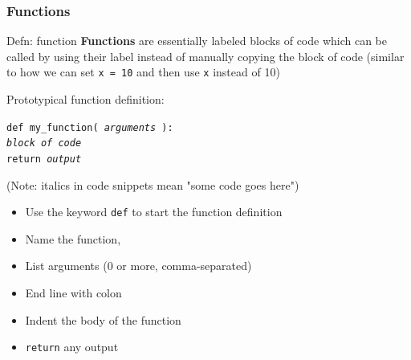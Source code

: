 \documentclass{beamer}
\newcommand{\code}[1]{\texttt{#1}}
\newcommand{\tab}{\hspace*{22pt}}
\begin{document}
\begin{frame}%
	\frametitle{Functions}
	
	\begin{alertblock}{Defn: function}
		\textbf{Functions} are essentially labeled blocks of code which can be called by using their label instead of manually copying the block of code (similar to how we can set \code{x = 10} and then use \code{x} instead of 10)
		
		\vspace{15pt}
			Prototypical function definition:
			
			\vspace{10pt}
			
			\code{def my\_function( \emph{arguments} ):\\
			\tab \emph{block of code} \\
			\tab return \emph{output}
			}
			
			\vspace{10pt}
			
			(Note: italics in code snippets mean "some code goes here")
		\endminipage\hfill
			\begin{itemize}
				\item Use the keyword \code{def} to start the function definition
				\item Name the function,
				\item List arguments (0 or more, comma-separated)
				\item End line with colon
				\item Indent the body of the function
				\item \code{return} any output 
			\end{itemize}
		\endminipage\hfill
	\end{alertblock}
	
\end{frame}
\end{document}

